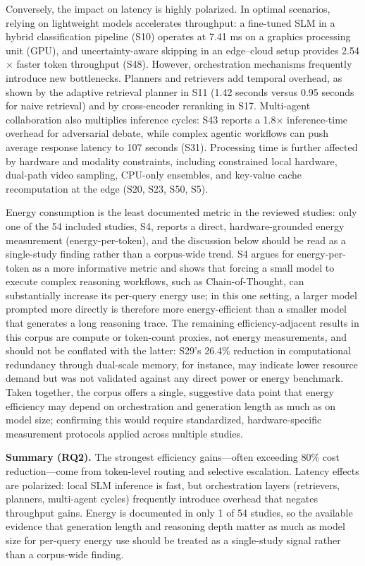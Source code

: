 Conversely, the impact on latency is highly polarized. In optimal scenarios, relying on lightweight models accelerates throughput: a fine-tuned SLM in a hybrid classification pipeline (S10) operates at 7.41 ms on a graphics processing unit (GPU), and uncertainty-aware skipping in an edge--cloud setup provides 2.54$\times$ faster token throughput (S48). However, orchestration mechanisms frequently introduce new bottlenecks. Planners and retrievers add temporal overhead, as shown by the adaptive retrieval planner in S11 (1.42 seconds versus 0.95 seconds for naive retrieval) and by cross-encoder reranking in S17. Multi-agent collaboration also multiplies inference cycles: S43 reports a 1.8$\times$ inference-time overhead for adversarial debate, while complex agentic workflows can push average response latency to 107 seconds (S31). Processing time is further affected by hardware and modality constraints, including constrained local hardware, dual-path video sampling, CPU-only ensembles, and key-value cache recomputation at the edge (S20, S23, S50, S5).

\label{sec:rq2_energy}
Energy consumption is the least documented metric in the reviewed studies: only one of the 54 included studies, S4, reports a direct, hardware-grounded energy measurement (energy-per-token), and the discussion below should be read as a single-study finding rather than a corpus-wide trend. S4 argues for energy-per-token as a more informative metric and shows that forcing a small model to execute complex reasoning workflows, such as Chain-of-Thought, can substantially increase its per-query energy use; in this one setting, a larger model prompted more directly is therefore more energy-efficient than a smaller model that generates a long reasoning trace. The remaining efficiency-adjacent results in this corpus are compute or token-count proxies, not energy measurements, and should not be conflated with the latter: S29's 26.4\% reduction in computational redundancy through dual-scale memory, for instance, may indicate lower resource demand but was not validated against any direct power or energy benchmark. Taken together, the corpus offers a single, suggestive data point that energy efficiency may depend on orchestration and generation length as much as on model size; confirming this would require standardized, hardware-specific measurement protocols applied across multiple studies.

\noindent\textbf{Summary (RQ2).} The strongest efficiency gains---often exceeding 80\% cost reduction---come from token-level routing and selective escalation. Latency effects are polarized: local SLM inference is fast, but orchestration layers (retrievers, planners, multi-agent cycles) frequently introduce overhead that negates throughput gains. Energy is documented in only 1 of 54 studies, so the available evidence that generation length and reasoning depth matter as much as model size for per-query energy use should be treated as a single-study signal rather than a corpus-wide finding.

